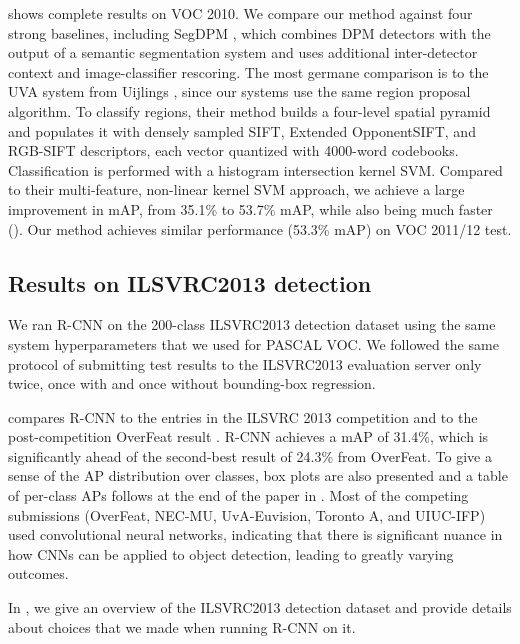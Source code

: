  shows complete results on VOC 2010. 
We compare our method against four strong baselines, including SegDPM \cite{fidler2013bottom}, which combines DPM detectors with the output of a semantic segmentation system \cite{o2p} and uses additional inter-detector context and image-classifier rescoring.
The most
germane comparison is to the UVA system from
Uijlings \etal \cite{UijlingsIJCV2013}, since our systems use the
same region proposal algorithm. To classify regions, their method builds a four-level
spatial pyramid and populates it with densely sampled SIFT,
Extended OpponentSIFT, and RGB-SIFT descriptors, each vector quantized with 4000-word codebooks. 
Classification is performed with a histogram intersection
kernel SVM. Compared to their multi-feature, non-linear kernel SVM
approach, we achieve a large improvement in mAP, from 35.1\% to
53.7\% mAP, while also being much faster ().
Our method achieves similar performance (53.3\% mAP) on VOC 2011/12 test.

\subsection{Results on ILSVRC2013 detection}
We ran R-CNN on the 200-class ILSVRC2013 detection dataset using the same system hyperparameters that we used for PASCAL VOC.
We followed the same protocol of submitting test results to the ILSVRC2013 evaluation server only twice, once with and once without bounding-box regression.

 compares R-CNN to the entries in the ILSVRC 2013 competition and to the post-competition OverFeat result \cite{overfeat}.
R-CNN achieves a mAP of 31.4\%, which is significantly ahead of the second-best result of 24.3\% from OverFeat.
To give a sense of the AP distribution over classes, box plots are also presented and a table of per-class APs follows at the end of the paper in .
Most of the competing submissions (OverFeat, NEC-MU, UvA-Euvision, Toronto A, and UIUC-IFP) used convolutional neural networks, indicating that there is significant nuance in how CNNs can be applied to object detection, leading to greatly varying outcomes.

In , we give an overview of the ILSVRC2013 detection dataset and provide details about choices that we made when running R-CNN on it.

